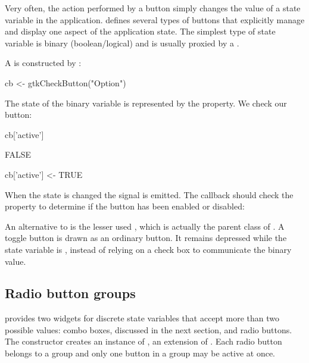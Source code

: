 Very often, the action performed by a button simply changes the value
of a state variable in the application. \GTK\/ defines several types
of buttons that explicitly manage and display one aspect of the
application state. The simplest type of state variable is binary
(boolean/logical) and is usually proxied by a .

A  is constructed by
:
\begin{Schunk}
\begin{Sinput}
 cb <- gtkCheckButton("Option")
\end{Sinput}
\end{Schunk}
%
The state of the binary variable is represented by the
 property. We check our button:
\begin{Schunk}
\begin{Sinput}
 cb['active']
\end{Sinput}
\begin{Soutput}
[1] FALSE
\end{Soutput}
\begin{Sinput}
 cb['active'] <- TRUE
\end{Sinput}
\end{Schunk}

When the state is changed the  signal is emitted. The
callback should check the  property to determine if the
button has been enabled or disabled:
\begin{Schunk}
\end{Schunk}

An alternative to  is the lesser used
, which is actually the parent class of
. A toggle button is drawn as an ordinary
button. It remains depressed while the state variable is ,
instead of relying on a check box to communicate the binary value.

\subsection{Radio button groups}
\label{sec:RGtk2:gtkRadioButton}

\GTK\/ provides two widgets for discrete state variables that accept
more than two possible values: combo boxes, discussed in the next
section, and radio buttons. The  constructor
creates an instance of , an extension of
. Each radio button belongs to a group and only
one button in a group may be active at once.

